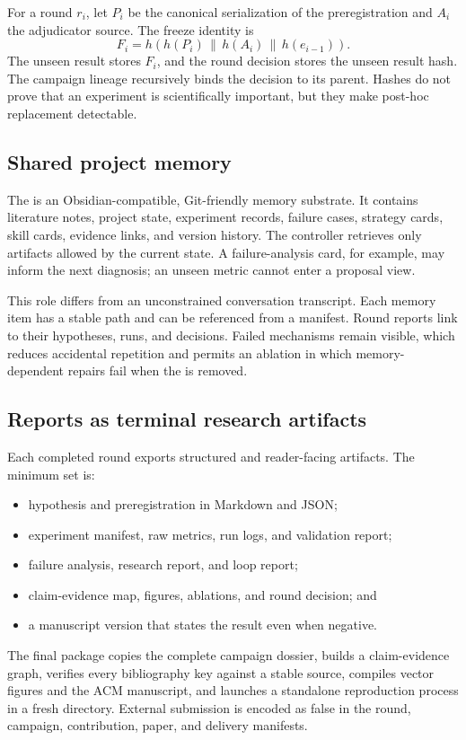 For a round \(r_i\), let \(P_i\) be the canonical serialization of the
preregistration and \(A_i\) the adjudicator source. The freeze identity is
\[
F_i = h\!\left(h(P_i) \,\|\, h(A_i) \,\|\, h(e_{i-1})\right).
\]
The unseen result stores \(F_i\), and the round decision stores the unseen
result hash. The campaign lineage recursively binds the decision to its
parent. Hashes do not prove that an experiment is scientifically important,
but they make post-hoc replacement detectable.

\subsection{Shared project memory}

The \vault{} is an Obsidian-compatible, Git-friendly memory substrate. It
contains literature notes, project state, experiment records, failure cases,
strategy cards, skill cards, evidence links, and version history. The
controller retrieves only artifacts allowed by the current state. A
failure-analysis card, for example, may inform the next diagnosis; an unseen
metric cannot enter a proposal view.

This role differs from an unconstrained conversation transcript. Each memory
item has a stable path and can be referenced from a manifest. Round reports
link to their hypotheses, runs, and decisions. Failed mechanisms remain
visible, which reduces accidental repetition and permits an ablation in which
memory-dependent repairs fail when the \vault{} is removed.

\subsection{Reports as terminal research artifacts}

Each completed round exports structured and reader-facing artifacts. The
minimum set is:

\begin{itemize}
  \item hypothesis and preregistration in Markdown and JSON;
  \item experiment manifest, raw metrics, run logs, and validation report;
  \item failure analysis, research report, and loop report;
  \item claim-evidence map, figures, ablations, and round decision; and
  \item a manuscript version that states the result even when negative.
\end{itemize}

The final package copies the complete campaign dossier, builds a
claim-evidence graph, verifies every bibliography key against a stable source,
compiles vector figures and the ACM manuscript, and launches a standalone
reproduction process in a fresh directory. External submission is encoded as
false in the round, campaign, contribution, paper, and delivery manifests.
